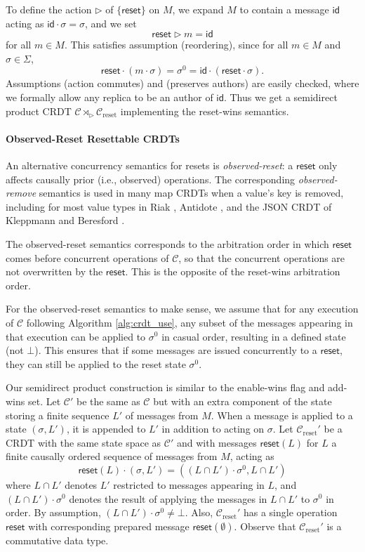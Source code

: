 \documentclass[acmsmall,nonacm]{acmart}
\newcommand{\mc}[1]{\ensuremath{\mathcal{#1}}}
\newcommand{\msf}[1]{\ensuremath{\mathsf{#1}}}
\newcommand{\act}{\triangleright}
\theoremstyle{plain}
\theoremstyle{definition}
\begin{document}
To define the action $\act$ of $\{\msf{reset}\}$ on $M$, we expand $M$ to contain a message $\msf{id}$ acting as $\msf{id} \cdot \sigma = \sigma$, and we set
\[
\msf{reset} \act m = \msf{id}
\]
for all $m \in M$.  This satisfies assumption (reordering), since for all $m \in M$ and $\sigma \in \Sigma$,
\[
\msf{reset} \cdot (m \cdot \sigma) = \sigma^0 = \msf{id} \cdot (\msf{reset} \cdot \sigma).
\]
Assumptions (action commutes) and (preserves authors) are easily checked, where we formally allow any replica to be an author of $\msf{id}$.  Thus we get a semidirect product CRDT $\mc{C} \rtimes_\act \mc{C}_{\text{reset}}$ implementing the reset-wins semantics.


\paragraph{Observed-Reset Resettable CRDTs}
An alternative concurrency semantics for resets is \textit{observed-reset}: a $\msf{reset}$ only affects causally prior (i.e., observed) operations.  The corresponding \textit{observed-remove} semantics is used in many map CRDTs when a value's key is removed, including for most value types in Riak \cite{riak_datatypes}, Antidote \cite{antidote}, and the JSON CRDT of Kleppmann and Beresford \cite{json}.

The observed-reset semantics corresponds to the arbitration order in which $\msf{reset}$ comes before concurrent operations of $\mc{C}$, so that the concurrent operations are not overwritten by the $\msf{reset}$.  This is the opposite of the reset-wins arbitration order.

For the observed-reset semantics to make sense, we assume that for any execution of $\mc{C}$ following Algorithm \ref{alg:crdt_use}, any subset of the messages appearing in that execution can be applied to $\sigma^0$ in casual order, resulting in a defined state (not $\bot$).  This ensures that if some messages are issued concurrently to a $\msf{reset}$, they can still be applied to the reset state $\sigma^0$.

Our semidirect product construction is similar to the enable-wins flag and add-wins set.  Let $\mc{C}'$ be the same as $\mc{C}$ but with an extra component of the state storing a finite sequence $L'$ of messages from $M$.  When a message is applied to a state $(\sigma, L')$, it is appended to $L'$ in addition to acting on $\sigma$.  Let $\mc{C}_{\text{reset}}'$ be a CRDT with the same state space as $\mc{C}'$ and with messages $\msf{reset}(L)$ for $L$ a finite causally ordered sequence of messages from $M$, acting as
\[
\msf{reset}(L) \cdot (\sigma, L') = ((L \cap L') \cdot \sigma^0, L \cap L')
\]
where $L \cap L'$ denotes $L'$ restricted to messages appearing in $L$, and $(L \cap L') \cdot \sigma^0$ denotes the result of applying the messages in $L \cap L'$ to $\sigma^0$ in order.  By assumption, $(L \cap L') \cdot \sigma^0 \neq \bot$.  Also, $\mc{C}_{\text{reset}}'$ has a single operation $\msf{reset}$ with corresponding prepared message $\msf{reset}(\emptyset)$.  Observe that $\mc{C}_{\text{reset}}'$ is a commutative data type.
\end{document}
